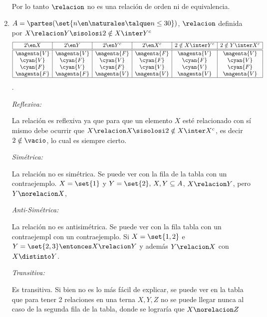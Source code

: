 \begin{enumerate}[label=\roman*)]
        Por lo tanto $\relacion$ no es una relación de orden ni de equivalencia.

  \item $
          A =
          \partes(\set{n \en \naturales \talque n \leq 30})$, $\relacion$ definida por $X \relacion Y \sisolosi 2 \notin X \inter Y^c
        $
        $$
          \begin{array}{|c|c|c|c|c|c|}
            \hline
            2 \en X     & 2 \en Y     & 2 \en Y^c   & 2 \en X^c   & 2 \notin X \inter Y^c & 2 \notin Y \inter X^c \\ \hline  \hline
            \magenta{V} & \magenta{V} & \magenta{F} & \magenta{F} & \magenta{V}           & \magenta{V}           \\
            \cyan{V}    & \cyan{F}    & \cyan{V}    & \cyan{F}    & \cyan{F}              & \cyan{V}              \\
            \cyan{F}    & \cyan{V}    & \cyan{F}    & \cyan{V}    & \cyan{V}              & \cyan{F}              \\
            \magenta{F} & \magenta{F} & \magenta{V} & \magenta{V} & \magenta{V}           & \magenta{V}           \\ \hline
          \end{array}$$.

        \textit{Reflexiva:}

        La relación es reflexiva ya que para que un elemento $X$ esté relacionado con sí mismo debe ocurrir
        que $X \relacion X \sisolosi 2 \notin X \inter X^c$, es decir $2 \notin \vacio$, lo cual es siempre cierto.

        \textit{Simétrica:}

        La relación no es simétrica. Se puede ver con la  fila de la tabla con un contraejemplo.
        $X = \set{1}$ y $Y = \set{2},\, X,Y \subseteq A$, $X \relacion Y$, pero $Y \norelacion X$,

        \textit{Anti-Simétrica:}

        La relación no es antisimétrica. Se puede ver con la  fila tabla con un contraejempl
        con un contraejemplo. Si $X = \set{1,2}$ e $Y = \set{2,3} \entonces X \relacion Y$ y además $Y \relacion X$
        con  $X \distinto Y$.

        \textit{Transitiva:}

        Es transitiva. Si bien no es lo más fácil de explicar, se puede ver en la tabla que para tener 2 relaciones
        en una terna $X, Y, Z$ no se puede llegar nunca al caso de la segunda fila de la tabla, donde se lograría que
        $X \norelacion Z$


\end{enumerate}
